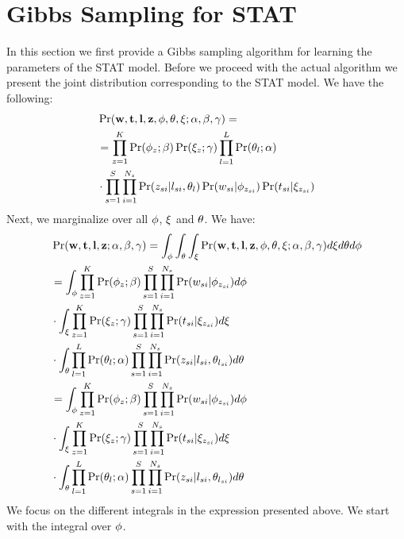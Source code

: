 \documentclass[conference]{IEEEtran}
\newcommand{\model}{{STAT}\xspace} %
\newcommand{\w}{{\bf w}}
\newcommand{\z}{{\bf z}}
\newcommand{\loc}{{\bf l}}
\newcommand{\tim}{{\bf t}}
\begin{document}



\appendix
\section{Gibbs Sampling for \model}
\label{sec:gibbs}
In this section we first provide a Gibbs sampling algorithm for learning the parameters of the \model model. Before we proceed with the actual algorithm we present the joint distribution corresponding to the \model model. We have the following:
{\scriptsize
\begin{align}
&\Pr(\w,\tim,\loc,\z,{\bf \phi},{\bf \theta},{\bf \xi};\alpha,\beta,\gamma) =  \nonumber \\
&=\prod_{z = 1}^{K}\Pr(\phi_z;\beta)\Pr(\xi_z;\gamma) \prod_{l = 1}^{L}\Pr(\theta_l;\alpha) \nonumber \\
& \cdot \prod_{s = 1}^{S}\prod_{i = 1}^{N_s} \Pr(z_{si}|l_{si},\theta_l)\Pr(w_{si}|\phi_{z_{si}})\Pr(t_{si}|\xi_{z_{si}}) \nonumber
\end{align}}
Next, we marginalize over all ${\bf \phi}$, ${\bf \xi}$ and ${\bf \theta}$. We have:
{\scriptsize
\begin{align}
&\Pr(\w,\tim,\loc,\z;\alpha,\beta,\gamma) =  \int_{\phi}\int_{\theta}\int_{\xi} \Pr(\w,\tim,\loc,\z,{\bf \phi},{\bf \theta},{\bf \xi};\alpha,\beta,\gamma) d\xi d\theta d\phi \nonumber \\
&=\int_{\phi} \prod_{z = 1}^{K}\Pr(\phi_z;\beta) \prod_{s = 1}^{S}\prod_{i = 1}^{N_s}\Pr(w_{si}|\phi_{z_{si}}) d\phi \nonumber \\
& \cdot \int_{\xi} \prod_{z = 1}^{K} \Pr(\xi_z;\gamma)\prod_{s = 1}^{S}\prod_{i = 1}^{N_s}\Pr(t_{si}|\xi_{z_{si}}) d\xi \nonumber \\
&\cdot \int_{\theta} \prod_{l = 1}^{L}\Pr(\theta_l;\alpha)\prod_{s = 1}^{S}\prod_{i = 1}^{N_s}\Pr(z_{si}|l_{si},\theta_{l_{si}})d\theta \nonumber \\
&=\int_{\phi} \prod_{z = 1}^{K}\Pr(\phi_z;\beta) \prod_{s = 1}^{S}\prod_{i = 1}^{N_s}\Pr(w_{si}|\phi_{z_{si}}) d\phi \nonumber \\
&  \cdot \int_{\xi} \prod_{z = 1}^{K} \Pr(\xi_z;\gamma)\prod_{s = 1}^{S}\prod_{i = 1}^{N_s}\Pr(t_{si}|\xi_{z_{si}}) d\xi \nonumber \\
&\cdot \int_{\theta} \prod_{l = 1}^{L}\Pr(\theta_l;\alpha)\prod_{s = 1}^{S}\prod_{i = 1}^{N_s}\Pr(z_{si}|l_{si},\theta_{l_{si}}) d\theta \nonumber
\end{align}
}
We focus on the different integrals in the expression presented above. We start with the integral over ${\bf \phi}$. 
\end{document}
